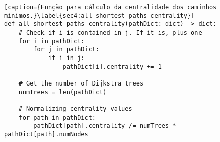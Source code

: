 \begin{lstlisting}[caption={Função para cálculo da centralidade dos caminhos mínimos.}\label{sec4:all_shortest_paths_centrality}]
def all_shortest_paths_centrality(pathDict: dict) -> dict:
	# Check if i is contained in j. If it is, plus one
	for i in pathDict:
		for j in pathDict:
			if i in j:
				pathDict[i].centrality += 1

	# Get the number of Dijkstra trees
	numTrees = len(pathDict)

	# Normalizing centrality values
	for path in pathDict:
		pathDict[path].centrality /= numTrees * pathDict[path].numNodes
\end{lstlisting}